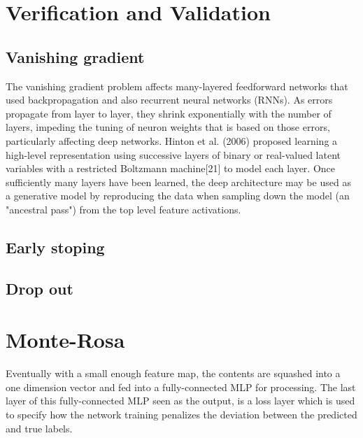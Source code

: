 \documentclass[final, paper=letter,5p,times,twocolumn]{elsarticle}
\begin{document}
\section{Verification and Validation}
\lipsum[20-20]

\subsection{Vanishing gradient}

The vanishing gradient problem affects many-layered feedforward networks that used backpropagation and also recurrent neural networks (RNNs). As errors propagate from layer to layer, they shrink exponentially with the number of layers, impeding the tuning of neuron weights that is based on those errors, particularly affecting deep networks. Hinton et al. (2006) proposed learning a high-level representation using successive layers of binary or real-valued latent variables with a restricted Boltzmann machine[21] to model each layer. Once sufficiently many layers have been learned, the deep architecture may be used as a generative model by reproducing the data when sampling down the model (an "ancestral pass") from the top level feature activations.\\
\lipsum[19-19]


\subsection{Early stoping}
\lipsum[21-21]
\subsection{Drop out}
\lipsum[22-22]


\section{Monte-Rosa}

\lipsum[30-33]

Eventually with a small enough feature map, the contents are squashed into a one dimension vector and fed into a fully-connected MLP for processing. The last layer of this fully-connected MLP seen as the output, is a loss layer which is used to specify how the network training penalizes the deviation between the predicted and true labels.
\end{document}
